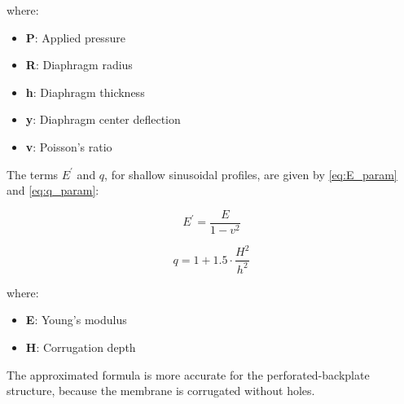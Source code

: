 \noindent
where:

\begin{itemize}
    \item \textbf{P}: Applied pressure
    \item \textbf{R}: Diaphragm radius
    \item \textbf{h}: Diaphragm thickness
    \item \textbf{y}: Diaphragm center deflection
    \item \textbf{v}: Poisson’s ratio
\end{itemize}

\noindent
The terms \(E^{'}\) and \(q\), for shallow sinusoidal profiles, are given by \cref{eq:E_param} and \cref{eq:q_param}:

\begin{equation}
    E^{'} = \frac{E}{1-v^2}
    \label{eq:E_param}
\end{equation}

\begin{equation}
    q = 1 + 1.5 \cdot \frac{H^2}{h^2}
    \label{eq:q_param}
\end{equation}

\noindent
where:

\begin{itemize}
    \item \textbf{E}: Young’s modulus
    \item \textbf{H}: Corrugation depth
\end{itemize}

\noindent
The approximated formula is more accurate for the perforated-backplate structure, because the membrane is corrugated without holes.
